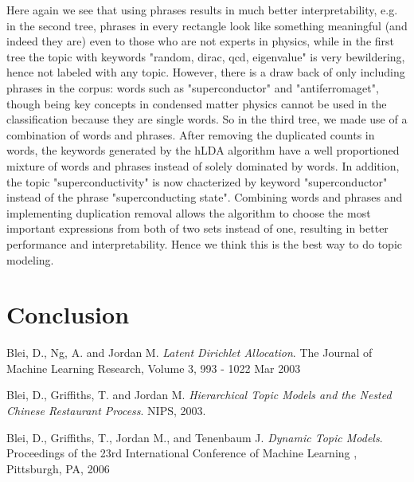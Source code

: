 \documentclass[DIV=calc, paper=letter, fontsize=10pt, twocolumn]{scrartcl}	 %
\begin{document}
Here again we see that using phrases results in much better interpretability, e.g. in the second tree, phrases in every rectangle look like something meaningful (and indeed they are) even to those who are not experts in physics, while in the first tree the topic with keywords "random, dirac, qcd, eigenvalue" is very bewildering, hence not labeled with any topic. However, there is a draw back of only including phrases in the corpus: words such as "superconductor" and "antiferromaget", though being key concepts in condensed matter physics cannot be used in the classification because they are single words. So in the third tree, we made use of a combination of words and phrases. After removing the duplicated counts in words, the keywords generated by the hLDA algorithm have a well proportioned mixture of words and phrases instead of solely dominated by words. In addition, the topic "superconductivity" is now chacterized by keyword "superconductor" instead of the phrase "superconducting state". Combining words and phrases and implementing duplication removal allows the algorithm to choose the most important expressions from both of two sets instead of one, resulting in better performance and interpretability. Hence we think this is the best way to do topic modeling.


\section*{Conclusion}


\begin{thebibliography}{99}

  Blei, D., Ng, A. and Jordan M.
  \emph{Latent Dirichlet Allocation}.
  The Journal of Machine Learning Research,
 Volume 3, 993 - 1022
 Mar 2003
 
  Blei, D., Griffiths, T. and Jordan M.
  \emph{Hierarchical Topic Models and the Nested Chinese Restaurant Process}.
  NIPS,
 2003.
 
  Blei, D., Griffiths, T., Jordan M., and Tenenbaum J. 
  \emph{Dynamic Topic Models}.
  Proceedings of the 23rd International Conference of Machine Learning ,
 Pittsburgh, PA,
 2006
 
 
\end{thebibliography}
\end{document}
